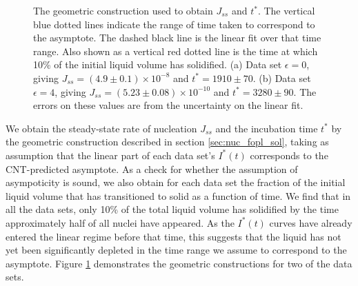 \begin{figure}[!h]
	\centering
	\caption{The geometric construction used to obtain $J_{ss}$ and $t^*$. The vertical blue dotted lines indicate the range of time taken to correspond to the asymptote. The dashed black line is the linear fit over that time range. Also shown as a vertical red dotted line is the time at which 10\% of the initial liquid volume has solidified. (a) Data set $\epsilon=0$, giving $J_{ss}=(4.9\pm 0.1)\times10^{-8}$ and $t^*=1910\pm 70$. (b) Data set $\epsilon=4$, giving $J_{ss}=(5.23\pm 0.08)\times10^{-10}$ and $t^*=3280\pm 90$. The errors on these values are from the uncertainty on the linear fit.}\label{fig:res_I_datasets_examples}
\end{figure}

We obtain the steady-state rate of nucleation $J_{ss}$ and the incubation time $t^*$ by the geometric construction described in section \ref{sec:nuc_fopl_sol}, taking as assumption that the linear part of each data set's $I^*(t)$ corresponds to the CNT-predicted asymptote. As a check for whether the assumption of asympoticity is sound, we also obtain for each data set the fraction of the initial liquid volume that has transitioned to solid as a function of time. We find that in all the data sets, only 10\% of the total liquid volume has solidified by the time approximately half of all nuclei have appeared. As the $I^*(t)$ curves have already entered the linear regime before that time, this suggests that the liquid has not yet been significantly depleted in the time range we assume to correspond to the asymptote. Figure \ref{fig:res_I_datasets_examples} demonstrates the geometric constructions for two of the data sets.%

